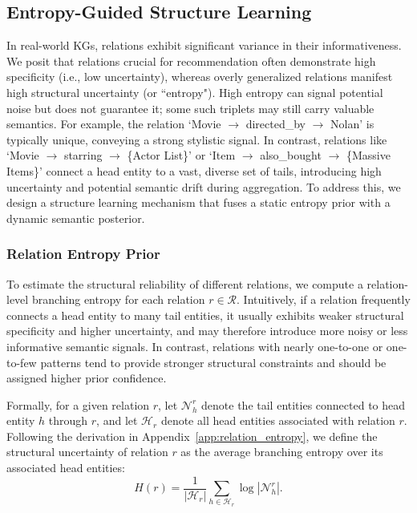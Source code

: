 \subsection{Entropy-Guided Structure Learning}
In real-world KGs, relations exhibit significant variance in their informativeness. We posit that relations crucial for recommendation often demonstrate high specificity (i.e., low uncertainty), whereas overly generalized relations manifest high structural uncertainty (or ``entropy"). High entropy can signal potential noise but does not guarantee it; some such triplets may still carry valuable semantics. For example, the relation `Movie $\rightarrow$ directed\_by $\rightarrow$ Nolan' is typically unique, conveying a strong stylistic signal. In contrast, relations like `Movie $\rightarrow$ starring $\rightarrow$ \{Actor List\}' or `Item $\rightarrow$ also\_bought $\rightarrow$ \{Massive Items\}' connect a head entity to a vast, diverse set of tails, introducing high uncertainty and potential semantic drift during aggregation. To address this, we design a structure learning mechanism that fuses a static entropy prior with a dynamic semantic posterior.


\subsubsection{Relation Entropy Prior}

To estimate the structural reliability of different relations, we compute a relation-level branching entropy for each relation \(r \in \mathcal{R}\). Intuitively, if a relation frequently connects a head entity to many tail entities, it usually exhibits weaker structural specificity and higher uncertainty, and may therefore introduce more noisy or less informative semantic signals. In contrast, relations with nearly one-to-one or one-to-few patterns tend to provide stronger structural constraints and should be assigned higher prior confidence.

Formally, for a given relation \(r\), let \(\mathcal{N}_{h}^{r}\) denote the tail entities connected to head entity \(h\) through \(r\), and let \(\mathcal{H}_{r}\) denote all head entities associated with relation \(r\). Following the derivation in Appendix~\ref{app:relation_entropy}, we define the structural uncertainty of relation \(r\) as the average branching entropy over its associated head entities:
\begin{equation}
\label{eq:relation_branching_entropy}
H(r)
=
\frac{1}{|\mathcal{H}_{r}|}
\sum_{h\in \mathcal{H}_{r}}
\log |\mathcal{N}_{h}^{r}|.
\end{equation}

